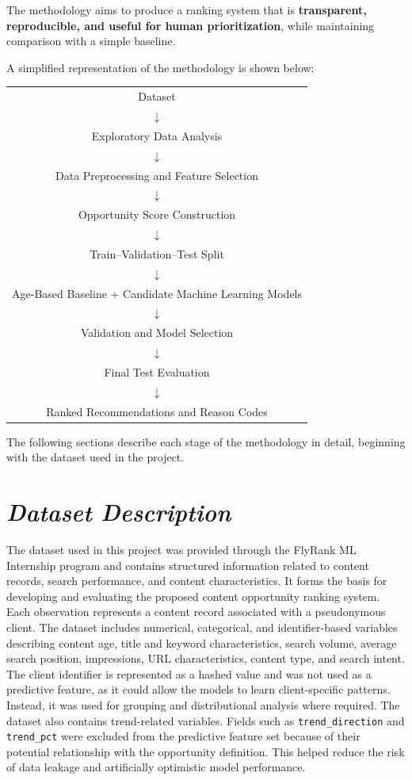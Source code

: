 \documentclass[12pt,a4paper]{report}
\begin{document}
The methodology aims to produce a ranking system that is \textbf{transparent, reproducible, and useful for human prioritization}, while maintaining comparison with a simple baseline.

A simplified representation of the methodology is shown below:

\begin{center}
\begin{tabular}{c}
Dataset \\
$\downarrow$ \\
Exploratory Data Analysis \\
$\downarrow$ \\
Data Preprocessing and Feature Selection \\
$\downarrow$ \\
Opportunity Score Construction \\
$\downarrow$ \\
Train--Validation--Test Split \\
$\downarrow$ \\
Age-Based Baseline + Candidate Machine Learning Models \\
$\downarrow$ \\
Validation and Model Selection \\
$\downarrow$ \\
Final Test Evaluation \\
$\downarrow$ \\
Ranked Recommendations and Reason Codes
\end{tabular}
\end{center}

The following sections describe each stage of the methodology in detail, beginning with the dataset used in the project.

\section{\textit{Dataset Description}}

The dataset used in this project was provided through the FlyRank ML Internship program and contains structured information related to content records, search performance, and content characteristics. It forms the basis for developing and evaluating the proposed content opportunity ranking system. Each observation represents a content record associated with a pseudonymous client. The dataset includes numerical, categorical, and identifier-based variables describing content age, title and keyword characteristics, search volume, average search position, impressions, URL characteristics, content type, and search intent. The client identifier is represented as a hashed value and was not used as a predictive feature, as it could allow the models to learn client-specific patterns. Instead, it was used for grouping and distributional analysis where required. The dataset also contains trend-related variables. Fields such as \texttt{trend\_direction} and \texttt{trend\_pct} were excluded from the predictive feature set because of their potential relationship with the opportunity definition. This helped reduce the risk of data leakage and artificially optimistic model performance.
\end{document}
